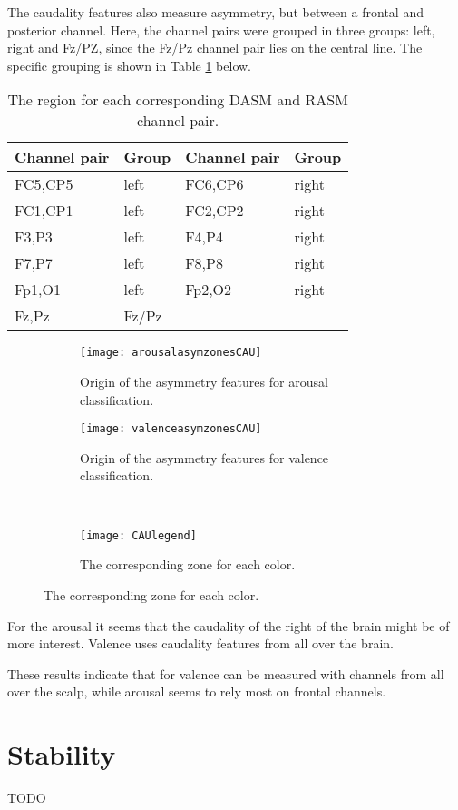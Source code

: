 \npar

The caudality features also measure asymmetry, but between a frontal and posterior channel. Here, the channel pairs were grouped in three groups: left, right and Fz/PZ, since the Fz/Pz channel pair lies on the central line. The specific grouping is shown in Table \ref{CAUgroupTable} below.

\begin{table}[H]
\centering
\begin{tabular}{ll|ll}
\textbf{Channel pair} & \textbf{Group} & \textbf{Channel pair} & \textbf{Group} \\ \hline
FC5,CP5               & left           & FC6,CP6               & right          \\
FC1,CP1               & left           & FC2,CP2               & right          \\
F3,P3                 & left           & F4,P4                 & right          \\
F7,P7                 & left           & F8,P8                 & right          \\
Fp1,O1                & left           & Fp2,O2                & right          \\
Fz,Pz                 & Fz/Pz          &                       &                \\
\end{tabular}
\caption{The region for each corresponding DASM and RASM channel pair\label{CAUgroupTable}.}
\end{table}

\begin{figure}[H]
\centering
  \begin{subfigure}[b]{.4\textwidth}
    \texttt{[image: arousalasymzonesCAU]}
    \caption{Origin of the asymmetry features for arousal classification.\label{arousalasymzonesCAU}}
  \end{subfigure}
\hfill
  \begin{subfigure}[b]{.4\textwidth}
    \texttt{[image: valenceasymzonesCAU]}
    \caption{Origin of the asymmetry features for valence classification.\label{valenceasymzonesCAU}}
  \end{subfigure}
\\
  \begin{subfigure}[b]{.5\textwidth}
    \texttt{[image: CAUlegend]}
    \caption{The corresponding zone for each color.\label{CAUlegend}}
  \end{subfigure}
\end{figure}

For the arousal it seems that the caudality of the right of the brain might be of more interest. Valence uses caudality features from all over the brain.

\npar

These results indicate that for valence can be measured with channels from all over the scalp, while arousal seems to rely most on frontal channels.

\section{Stability}
TODO

